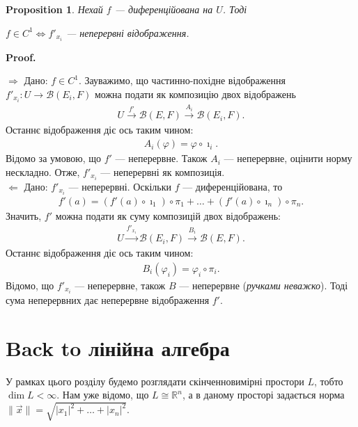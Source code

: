 \documentclass[a4paper, 10pt]{article}
\makeatletter
\def\rightproof{$\boxed{\Rightarrow}$ }
\def\leftproof{$\boxed{\Leftarrow}$ }
\theoremstyle{theoremdd}
\theoremstyle{theoremdd}
\theoremstyle{theoremdd}
\theoremstyle{theoremdd}
\theoremstyle{theoremdd}
\newtheorem{proposition}[theorem]{Proposition}
\theoremstyle{theoremdd}
\theoremstyle{theoremdd}
\theoremstyle{theoremdd}
\renewenvironment{proof}[1][Proof.\\]{\par
\pushQED{\hfill \qed}%
\normalfont \topsep6\p@\@plus6\p@\relax
\trivlist
\item\relax
{\bfseries
#1\@addpunct{.}}\hspace\labelsep\ignorespaces
}{%
\popQED\endtrivlist\@endpefalse
}
\makeatother
\begin{document}
\begin{proposition}
Нехай $f$ --- диференційована на $U$. Тоді
\begin{center}
$f \in C^1 \iff f'_{x_i}$ --- неперервні відображення.
\end{center}
\end{proposition}

\begin{proof}
\rightproof Дано: $f \in C^1$. Зауважимо, що частинно-похідне відображення $f'_{x_i} \colon U \to \mathcal{B}(E_i,F)$ можна подати як композицію двох відображень
\begin{align*}
U \overset{f'}{\to} \mathcal{B}(E,F) \overset{A_i}{\to} \mathcal{B}(E_i,F).
\end{align*}
Останнє відображення діє ось таким чином:
\begin{align*}
A_i(\varphi) = \varphi \circ \imath_i.
\end{align*}
Відомо за умовою, що $f'$ --- неперервне. Також $A_i$ --- неперервне, оцінити норму нескладно. Отже, $f'_{x_i}$ --- неперервні як композиція.
\bigskip \\
\leftproof Дано: $f'_{x_i}$ --- неперервні. Оскільки $f$ --- диференційована, то
\begin{align*}
f'(a) = (f'(a) \circ \imath_1) \circ \pi_1 + \dots + (f'(a) \circ \imath_n) \circ \pi_n.
\end{align*}
Значить, $f'$ можна подати як суму композицій двох відображень:
\begin{align*}
U \overset{f'_{x_i}}{\to} \mathcal{B}(E_i,F) \overset{B_i}{\to} \mathcal{B}(E,F).
\end{align*}
Останнє відображення діє ось таким чином:
\begin{align*}
B_i(\varphi_i) = \varphi_i \circ \pi_i.
\end{align*}
Відомо, що $f'_{x_i}$ --- неперервне, також $B$ --- неперервне (\textit{ручками неважко}). Тоді сума неперервних дає неперервне відображення $f'$.
\end{proof}

\newpage

\section*{Back to лінійна алгебра}
У рамках цього розділу будемо розглядати скінченновимірні простори $L$, тобто $\dim L < \infty$. Нам уже відомо, що $L \cong \mathbb{R}^n$, а в даному просторі задається норма $\|\vec{x}\| = \sqrt{|x_1|^2 + \dots + |x_n|^2}$.
\end{document}
